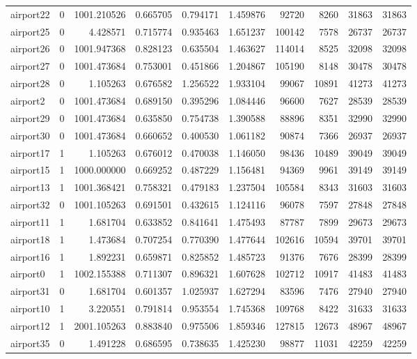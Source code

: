 \documentclass[../../../thesis.tex]{subfiles}
\begin{document}
\begin{longtable}{|l|r|r|r|r|r|r|r|r|r|}
airport22 & 0 & 1001.210526 & 0.665705 & 0.794171 & 1.459876 & 92720 & 8260 & 31863 & 31863 \\
airport25 & 0 & 4.428571 & 0.715774 & 0.935463 & 1.651237 & 100142 & 7578 & 26737 & 26737 \\
airport26 & 0 & 1001.947368 & 0.828123 & 0.635504 & 1.463627 & 114014 & 8525 & 32098 & 32098 \\
airport27 & 0 & 1001.473684 & 0.753001 & 0.451866 & 1.204867 & 105190 & 8148 & 30478 & 30478 \\
airport28 & 0 & 1.105263 & 0.676582 & 1.256522 & 1.933104 & 99067 & 10891 & 41273 & 41273 \\
airport2 & 0 & 1001.473684 & 0.689150 & 0.395296 & 1.084446 & 96600 & 7627 & 28539 & 28539 \\
airport29 & 0 & 1001.473684 & 0.635850 & 0.754738 & 1.390588 & 88896 & 8351 & 32990 & 32990 \\
airport30 & 0 & 1001.473684 & 0.660652 & 0.400530 & 1.061182 & 90874 & 7366 & 26937 & 26937 \\
airport17 & 1 & 1.105263 & 0.676012 & 0.470038 & 1.146050 & 98436 & 10489 & 39049 & 39049 \\
airport15 & 1 & 1000.000000 & 0.669252 & 0.487229 & 1.156481 & 94369 & 9961 & 39149 & 39149 \\
airport13 & 1 & 1001.368421 & 0.758321 & 0.479183 & 1.237504 & 105584 & 8343 & 31603 & 31603 \\
airport32 & 0 & 1001.105263 & 0.691501 & 0.432615 & 1.124116 & 96078 & 7597 & 27848 & 27848 \\
airport11 & 1 & 1.681704 & 0.633852 & 0.841641 & 1.475493 & 87787 & 7899 & 29673 & 29673 \\
airport18 & 1 & 1.473684 & 0.707254 & 0.770390 & 1.477644 & 102616 & 10594 & 39701 & 39701 \\
airport16 & 1 & 1.892231 & 0.659871 & 0.825852 & 1.485723 & 91376 & 7676 & 28399 & 28399 \\
airport0 & 1 & 1002.155388 & 0.711307 & 0.896321 & 1.607628 & 102712 & 10917 & 41483 & 41483 \\
airport31 & 0 & 1.681704 & 0.601357 & 1.025937 & 1.627294 & 83596 & 7476 & 27940 & 27940 \\
airport10 & 1 & 3.220551 & 0.791814 & 0.953554 & 1.745368 & 109768 & 8422 & 31633 & 31633 \\
airport12 & 1 & 2001.105263 & 0.883840 & 0.975506 & 1.859346 & 127815 & 12673 & 48967 & 48967 \\
airport35 & 0 & 1.491228 & 0.686595 & 0.738635 & 1.425230 & 98877 & 11031 & 42259 & 42259 \\

\end{longtable}
\end{document}
